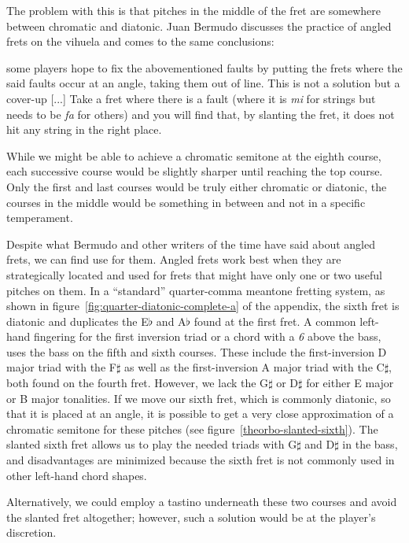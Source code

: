 The problem with this is that pitches in the middle of the fret are somewhere between
chromatic and diatonic.  Juan Bermudo discusses the practice of angled frets on the
vihuela and comes to the same conclusions:
\begin{blocks}
[...] some players hope to fix the abovementioned faults by putting the frets where the
said faults occur at an angle, taking them out of line. This is not a solution but a
cover-up [...] Take a fret where there is a fault (where it is \textit{mi} for strings
but needs to be \textit{fa} for others) and you will find that, by slanting the fret,
it does not hit any string in the right place. \autocite[112-113]{DE:1}
\end{blocks}
While we might be able to achieve a chromatic semitone at the eighth course, each
successive course would be slightly sharper until reaching the top course.  Only the
first and last courses would be truly either chromatic or diatonic, the courses in the
middle would be something in between and not in a specific temperament.

Despite what Bermudo and other writers of the time have said about angled frets, we can
find use for them.  Angled frets work best when they are strategically located and used
for frets that might have only one or two useful pitches on them. In a ``standard''
quarter-comma meantone fretting system, as shown in
figure~\ref{fig:quarter-diatonic-complete-a} of the appendix, the sixth fret is diatonic
and duplicates the E$\flat$ and A$\flat$ found at the first fret.  A common left-hand
fingering for the first inversion triad or a chord with a \textit{6} above the bass,
uses the bass on the fifth and sixth courses. These include the first-inversion D major
triad with the F$\sharp$ as well as the first-inversion A major triad with the
C$\sharp$, both found on the fourth fret. However, we lack the G$\sharp$ or D$\sharp$
for either E major or B major tonalities. If we move our sixth fret, which is commonly
diatonic, so that it is placed at an angle, it is possible to get a very close
approximation of a chromatic semitone for these pitches (see
figure~\ref{theorbo-slanted-sixth}).  The slanted sixth fret allows us to play the
needed triads with G$\sharp$ and D$\sharp$ in the bass, and disadvantages are minimized
because the sixth fret is not commonly used in other left-hand chord shapes.

Alternatively, we could employ a tastino underneath these two courses and avoid the
slanted fret altogether; however, such a solution would be at the player's discretion.


